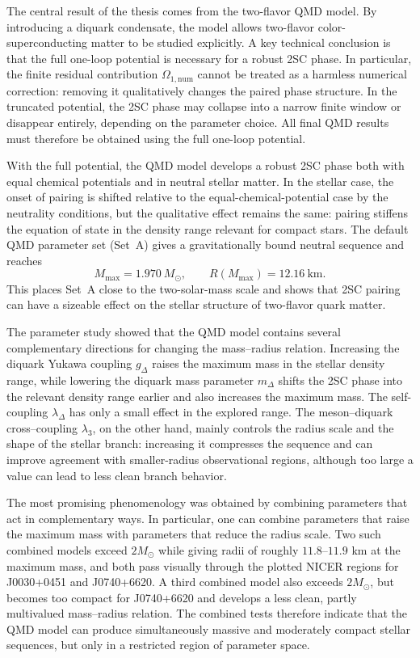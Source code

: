 The central result of the thesis comes from the two-flavor QMD model. By
introducing a diquark condensate, the model
allows two-flavor color-superconducting matter to be studied explicitly. A key
technical conclusion is that the full one-loop potential is necessary for a
robust 2SC phase. In particular, the finite residual contribution
\(\Omega_{1,\mathrm{num}}\) cannot be treated as a harmless numerical correction:
removing it qualitatively changes the paired phase structure. In the truncated
potential, the 2SC phase may collapse into a narrow finite window or disappear
entirely, depending on the parameter choice. All final QMD results must
therefore be obtained using the full one-loop potential.

With the full potential, the QMD model develops a robust 2SC phase both with
equal chemical potentials and in neutral stellar matter. In the stellar case,
the onset of pairing is shifted relative to the equal-chemical-potential case by
the neutrality conditions, but the qualitative effect remains the same: pairing
stiffens the equation of state in the density range relevant for compact stars.
The default QMD parameter set (Set~A) gives a gravitationally bound neutral sequence and reaches
\[
    M_{\max}=1.970~M_\odot,
    \qquad
    R(M_{\max})=12.16~\mathrm{km}.
\]
This places Set~A close to the two-solar-mass scale and shows that
2SC pairing can have a sizeable effect on the stellar structure of two-flavor
quark matter.

The parameter study showed that the QMD model contains several complementary
directions for changing the mass--radius relation. Increasing the diquark Yukawa
coupling \(g_\Delta\) raises the maximum mass in the stellar density range,
while lowering the diquark mass parameter \(m_\Delta\) shifts the 2SC phase into
the relevant density range earlier and also increases the maximum mass. The
self-coupling \(\lambda_\Delta\) has only a small effect in the explored range.
The meson--diquark cross--coupling \(\lambda_3\), on the other hand, mainly controls the radius
scale and the shape of the stellar branch: increasing it compresses the sequence
and can improve agreement with smaller-radius observational regions, although
too large a value can lead to less clean branch behavior.

The most promising phenomenology was obtained by combining parameters that act
in complementary ways. In particular, one can combine parameters that raise the
maximum mass with parameters that reduce the radius scale. Two such combined
models exceed \(2M_\odot\) while giving radii of roughly \(11.8\)--\(11.9\) km
at the maximum mass, and both pass visually through the plotted NICER regions
for J0030+0451 and J0740+6620. A third combined model also exceeds
\(2M_\odot\), but becomes too compact for J0740+6620 and develops a less clean,
partly multivalued mass--radius relation. The combined tests therefore indicate
that the QMD model can produce simultaneously massive and moderately compact
stellar sequences, but only in a restricted region of parameter space.


